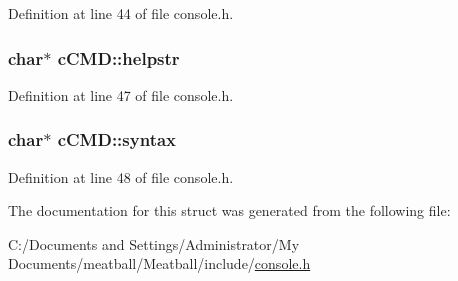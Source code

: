 Definition at line 44 of file console.\-h.

\hypertarget{structc_c_m_d_a3bf87b48a17d5153fe779c48502a3f15}{
\subsubsection[{helpstr}]{\setlength{\rightskip}{0pt plus 5cm}char$\ast$ c\-C\-M\-D\-::helpstr}}\label{structc_c_m_d_a3bf87b48a17d5153fe779c48502a3f15}


Definition at line 47 of file console.\-h.

\hypertarget{structc_c_m_d_afdf6b992caaf1b6cd0f6ede278b98797}{
\subsubsection[{syntax}]{\setlength{\rightskip}{0pt plus 5cm}char$\ast$ c\-C\-M\-D\-::syntax}}\label{structc_c_m_d_afdf6b992caaf1b6cd0f6ede278b98797}


Definition at line 48 of file console.\-h.



The documentation for this struct was generated from the following file\-:\begin{DoxyCompactItemize}
\item 
C\-:/\-Documents and Settings/\-Administrator/\-My Documents/meatball/\-Meatball/include/\hyperlink{console_8h}{console.\-h}\end{DoxyCompactItemize}
